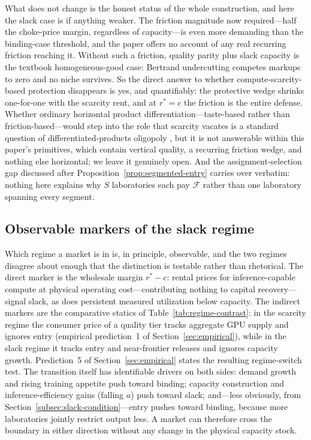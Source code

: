 \documentclass[11pt]{article}
\begin{document}
What does not change is the honest status of the whole construction, and here the slack case is if anything weaker. The friction magnitude now required---half the choke-price margin, regardless of capacity---is even more demanding than the binding-case threshold, and the paper offers no account of any real recurring friction reaching it. Without such a friction, quality parity plus slack capacity is the textbook homogeneous-good case: Bertrand undercutting competes markups to zero and no niche survives. So the direct answer to whether compute-scarcity-based protection disappears is yes, and quantifiably: the protective wedge shrinks one-for-one with the scarcity rent, and at $r^{*}=c$ the friction is the entire defense. Whether ordinary horizontal product differentiation---taste-based rather than friction-based---would step into the role that scarcity vacates is a standard question of differentiated-products oligopoly \citep{singhVives1984}, but it is not answerable within this paper's primitives, which contain vertical quality, a recurring friction wedge, and nothing else horizontal; we leave it genuinely open. And the assignment-selection gap discussed after Proposition~\ref{prop:segmented-entry} carries over verbatim: nothing here explains why $S$ laboratories each pay $\mathcal F$ rather than one laboratory spanning every segment.

\subsection{Observable markers of the slack regime}
\label{subsec:slack-empirics}

Which regime a market is in is, in principle, observable, and the two regimes disagree about enough that the distinction is testable rather than rhetorical. The direct marker is the wholesale margin $r^{*}-c$: rental prices for inference-capable compute at physical operating cost---contributing nothing to capital recovery---signal slack, as does persistent measured utilization below capacity. The indirect markers are the comparative statics of Table~\ref{tab:regime-contrast}: in the scarcity regime the consumer price of a quality tier tracks aggregate GPU supply and ignores entry (empirical prediction~1 of Section~\ref{sec:empirical}), while in the slack regime it tracks entry and near-frontier releases and ignores capacity growth. Prediction~5 of Section~\ref{sec:empirical} states the resulting regime-switch test. The transition itself has identifiable drivers on both sides: demand growth and rising training appetite push toward binding; capacity construction and inference-efficiency gains (falling $a$) push toward slack; and---less obviously, from Section~\ref{subsec:slack-condition}---entry pushes toward binding, because more laboratories jointly restrict output less. A market can therefore cross the boundary in either direction without any change in the physical capacity stock.
\end{document}
